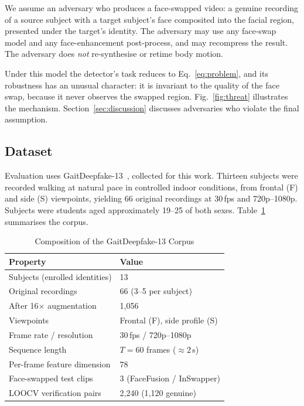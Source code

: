 \documentclass[journal]{IEEEtran}
\newcommand{\tabhead}[1]{\textbf{#1}}
\begin{document}
We assume an adversary who produces a face-swapped video: a genuine recording
of a source subject with a target subject's face composited into the facial
region, presented under the target's identity. The adversary may use any
face-swap model and any face-enhancement post-process, and may recompress the
result. The adversary does \emph{not} re-synthesise or retime body motion.

Under this model the detector's task reduces to Eq.~\ref{eq:problem}, and its
robustness has an unusual character: it is invariant to the quality of the face
swap, because it never observes the swapped region. Fig.~\ref{fig:threat}
illustrates the mechanism. Section~\ref{sec:discussion} discusses adversaries
who violate the final assumption.

\subsection{Dataset}
\label{sec:dataset}

Evaluation uses GaitDeepfake-13~\cite{gaitdeepfake13}, collected for this work.
Thirteen subjects were recorded walking at natural pace in controlled indoor
conditions, from frontal (F) and side (S) viewpoints, yielding 66 original
recordings at 30\,fps and 720p--1080p. Subjects were students aged approximately
19--25 of both sexes. Table~\ref{tab:dataset} summarises the corpus.

\begin{table}[!t]
\caption{Composition of the GaitDeepfake-13 Corpus}
\label{tab:dataset}
\centering
\begin{tabular}{ll}
\toprule
\tabhead{Property} & \tabhead{Value} \\
\midrule
Subjects (enrolled identities)   & 13 \\
Original recordings              & 66 (3--5 per subject) \\
After 16$\times$ augmentation    & 1{,}056 \\
Viewpoints                       & Frontal (F), side profile (S) \\
Frame rate / resolution          & 30\,fps / 720p--1080p \\
Sequence length                  & $T = 60$ frames ($\approx$2\,s) \\
Per-frame feature dimension      & 78 \\
Face-swapped test clips          & 3 (FaceFusion / InSwapper) \\
LOOCV verification pairs         & 2{,}240 (1{,}120 genuine) \\
\bottomrule
\end{tabular}
\end{table}
\end{document}
